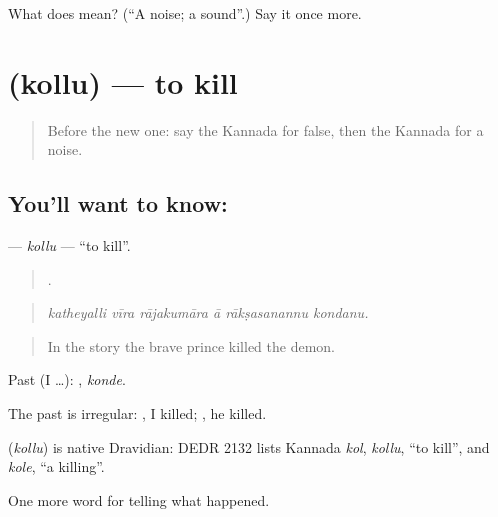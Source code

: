 \begin{tcolorbox}[breakable,colback=teal!4,colframe=teal!35!black,title={Before you move on}]
What does  mean? (\textquotedblleft{}A noise; a sound\textquotedblright{}.) Say it once more.
\end{tcolorbox}
\section[\texorpdfstring{\kn{ಕೊಲ್ಲು} (kollu)}{ಕೊಲ್ಲು (kollu)}]{ (kollu) — to kill}

\label{lesson:KA-C374-kollu}



\begin{quote}
Before the new one: say the Kannada for false, then the Kannada for a noise.
\end{quote}

\subsection*{You'll want to know: }
\textbf{} — \emph{kollu} — \textquotedblleft{}to kill\textquotedblright{}.

\begin{quote}
     .
\end{quote}

\begin{quote}
\emph{katheyalli vīra rājakumāra ā rākṣasanannu kondanu.}
\end{quote}

\begin{quote}
In the story the brave prince killed the demon.
\end{quote}

Past (I …): , \emph{konde}.

The past is irregular: , I killed; , he killed.

\begin{cousinweb}
\textbf{} (\emph{kollu}) is native Dravidian: DEDR 2132 lists Kannada \emph{kol}, \emph{kollu}, \textquotedblleft{}to kill\textquotedblright{}, and \emph{kole}, \textquotedblleft{}a killing\textquotedblright{}.
\end{cousinweb}

\begin{grammarlens}[title={What you've built}]
One more word for telling what happened.
\end{grammarlens}

